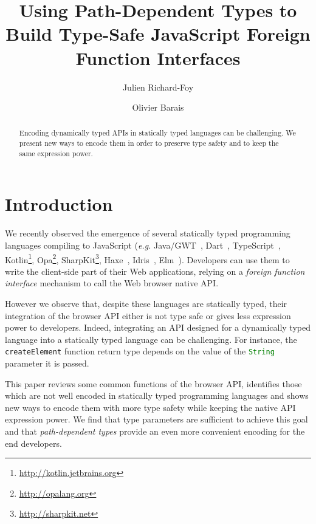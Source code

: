 \documentclass{llncs}
\newcommand{\jscode}[1]{\lstinline[language=JavaScript]|#1|}
\begin{document}
 \title{Using Path-Dependent Types to Build Type-Safe JavaScript Foreign Function Interfaces}

 \author{Julien Richard-Foy \and Olivier Barais}



 \maketitle

\begin{abstract}
Encoding dynamically typed APIs in statically typed languages can be challenging. We present new ways to encode them in order to preserve type safety and to keep the same expression power.
\end{abstract}

\section{Introduction}

We recently observed the emergence of several statically typed programming languages compiling to JavaScript (\emph{e.g.} Java/GWT~\cite{Kereki09_GWT}, Dart~\cite{Griffith11_Dart}, TypeScript~\cite{fenton2012typescript}, Kotlin\footnote{\href{http://kotlin.jetbrains.org}{http://kotlin.jetbrains.org}}, Opa\footnote{\href{http://opalang.org}{http://opalang.org}}, SharpKit\footnote{\href{http://sharpkit.net}{http://sharpkit.net}}, Haxe~\cite{Cannasse08_HaXe}, Idris~\cite{Brady13_Idris}, Elm~\cite{czaplicki2012elm}). Developers can use them to write the client-side part of their Web applications, relying on a \emph{foreign function interface} mechanism to call the Web browser native API.

However we observe that, despite these languages are statically typed, their integration of the browser API either is not type safe or gives less expression power to developers. Indeed, integrating an API designed for a dynamically typed language into a statically typed language can be challenging. For instance, the \jscode{createElement} function return type depends on the value of the \jscode{String} parameter it is passed.

This paper reviews some common functions of the browser API, identifies those which are not well encoded in statically typed programming languages and shows new ways to encode them with more type safety while keeping the native API expression power. We find that type parameters are sufficient to achieve this goal and that \emph{path-dependent types} provide an even more convenient encoding for the end developers.
\end{document}
